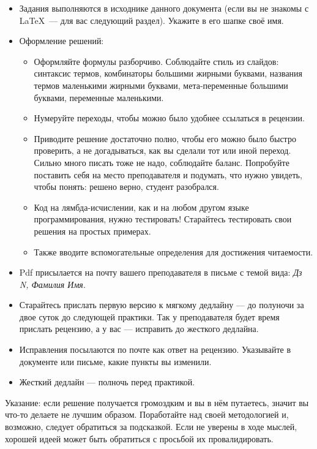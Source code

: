 \documentclass{article}
\begin{document}
    \begin{itemize}
        \item Задания выполняются в исходнике данного документа (если вы не знакомы с \LaTeX~--- для вас следующий раздел).
        Укажите в его шапке своё имя.
        \item Оформление решений:
        \begin{itemize}
            \item Оформляйте формулы разборчиво.
            Соблюдайте стиль из слайдов: синтаксис термов, комбинаторы большими жирными буквами, названия термов маленькими жирными буквами, мета-переменные большими буквами, переменные маленькими.
            \item Нумеруйте переходы, чтобы можно было удобнее ссылаться в рецензии.
            \item Приводите решение достаточно полно, чтобы его можно было быстро проверить, а не догадываться, как вы сделали тот или иной переход.
            Сильно много писать тоже не надо, соблюдайте баланс.
            Попробуйте поставить себя на место преподавателя и подумать, что нужно увидеть, чтобы понять: решено верно, студент разобрался.
            \item Код на лямбда-исчислении, как и на любом другом языке программирования, нужно тестировать!
            Старайтесь тестировать свои решения на простых примерах.
            \item Также вводите вспомогательные определения для достижения читаемости.
        \end{itemize}
        \item Pdf присылается на почту вашего преподавателя в письме с темой вида: \textit{Дз N, Фамилия Имя}.
        \item Старайтесь прислать первую версию к мягкому дедлайну --- до полуночи за двое суток до следующей практики.
        Так у преподавателя будет время прислать рецензию, а у вас --- исправить до жесткого дедлайна.
        \item Исправления посылаются по почте как ответ на рецензию.
        Указывайте в документе или письме, какие пункты вы изменили.
        \item Жесткий дедлайн --- полночь перед практикой.
    \end{itemize}

    Указание: если решение получается громоздким и вы в нём путаетесь, значит вы что-то делаете не лучшим образом.
    Поработайте над своей методологией и, возможно, следует обратиться за подсказкой.
    Если не уверены в ходе мыслей, хорошей идеей может быть обратиться с просьбой их провалидировать.
\end{document}
